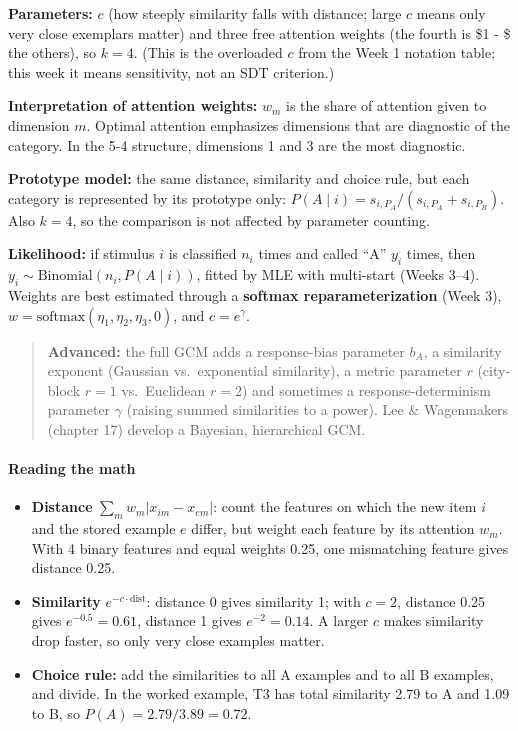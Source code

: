 \textbf{Parameters:} \(c\) (how steeply similarity falls with distance;
large \(c\) means only very close exemplars matter) and three free
attention weights (the fourth is \$1 - \$ the others), so \(k = 4\).
(This is the overloaded \(c\) from the Week 1 notation table; this week
it means sensitivity, not an SDT criterion.)

\textbf{Interpretation of attention weights:} \(w_m\) is the share of
attention given to dimension \(m\). Optimal attention emphasizes
dimensions that are diagnostic of the category. In the 5-4 structure,
dimensions 1 and 3 are the most diagnostic.

\textbf{Prototype model:} the same distance, similarity and choice rule,
but each category is represented by its prototype only:
\(P(A\mid i) = s_{i,P_A}/(s_{i,P_A} + s_{i,P_B})\). Also \(k = 4\), so
the comparison is not affected by parameter counting.

\textbf{Likelihood:} if stimulus \(i\) is classified \(n_i\) times and
called ``A'' \(y_i\) times, then
\(y_i \sim \mathrm{Binomial}(n_i, P(A\mid i))\), fitted by MLE with
multi-start (Weeks 3--4). Weights are best estimated through a
\textbf{softmax reparameterization} (Week 3),
\(w = \mathrm{softmax}(\eta_1, \eta_2, \eta_3, 0)\), and
\(c = e^{\gamma}\).

\begin{quote}
\textbf{Advanced:} the full GCM adds a response-bias parameter \(b_A\),
a similarity exponent (Gaussian vs.~exponential similarity), a metric
parameter \(r\) (city-block \(r = 1\) vs.~Euclidean \(r = 2\)) and
sometimes a response-determinism parameter \(\gamma\) (raising summed
similarities to a power). Lee \& Wagenmakers (chapter 17) develop a
Bayesian, hierarchical GCM.
\end{quote}

\paragraph{Reading the math}

\begin{itemize}
\tightlist
\item
  \textbf{Distance} \(\sum_m w_m|x_{im} - x_{em}|\): count the features
  on which the new item \(i\) and the stored example \(e\) differ, but
  weight each feature by its attention \(w_m\). With 4 binary features
  and equal weights 0.25, one mismatching feature gives distance 0.25.
\item
  \textbf{Similarity} \(e^{-c \cdot \mathrm{dist}}\): distance 0 gives
  similarity 1; with \(c = 2\), distance 0.25 gives \(e^{-0.5} = 0.61\),
  distance 1 gives \(e^{-2} = 0.14\). A larger \(c\) makes similarity
  drop faster, so only very close examples matter.
\item
  \textbf{Choice rule:} add the similarities to all A examples and to
  all B examples, and divide. In the worked example, T3 has total
  similarity 2.79 to A and 1.09 to B, so \(P(A) = 2.79/3.89 = 0.72\).
\end{itemize}

